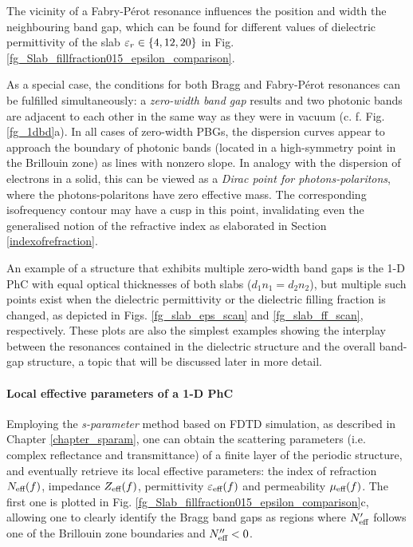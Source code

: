 The vicinity of a Fabry-Pérot resonance influences the position and width the neighbouring band gap, which can be found for different values of dielectric permittivity of the slab $\varepsilon_r\in\{4,12,20\}$ in Fig. \ref{fg_Slab_fillfraction015_epsilon_comparison}.

\label{diracpoint}
As a special case, the conditions for both Bragg and Fabry-Pérot resonances can be fulfilled simultaneously: a \textit{zero-width band gap} results and two photonic bands are adjacent to each other in the same way as they were in vacuum (c. f. Fig. \ref{fg_1dbd}a). In all cases of zero-width PBGs, the dispersion curves appear to approach the boundary of photonic bands (located in a high-symmetry point in the Brillouin zone) as lines with nonzero slope. In analogy with the dispersion of electrons in a solid, this can be viewed as a \textit{Dirac point for photons-polaritons}, where the photons-polaritons have zero effective mass. The corresponding isofrequency contour may have a cusp in this point, invalidating even the generalised notion of the refractive index as elaborated in Section \ref{indexofrefraction}.

An example of a structure that exhibits multiple zero-width band gaps is the 1-D PhC with equal optical thicknesses of both slabs ($d_1 n_1 = d_2 n_2$), but multiple such points exist when the dielectric permittivity or the dielectric filling fraction is changed, as depicted in Figs. \ref{fg_slab_eps_scan} and \ref{fg_slab_ff_scan}, respectively. These plots are also the simplest examples showing the interplay between the resonances contained in the dielectric structure and the overall band-gap structure, a topic that will be discussed later in more detail.

\paragraph{Local effective parameters of a 1-D PhC}%
Employing the \textit{s-parameter} method based on FDTD simulation, as described in Chapter \ref{chapter_sparam}, one can obtain the scattering parameters (i.e. complex reflectance and transmittance) of a finite layer of the periodic structure, and eventually retrieve its local effective parameters: the index of refraction $N_{\text{eff} }(f)$, impedance $Z_{\text{eff} }(f)$, permittivity $\varepsilon_{\text{eff} }(f)$ and permeability $\mu_{\text{eff} }(f)$. The first one is plotted in Fig. \ref{fg_Slab_fillfraction015_epsilon_comparison}c, allowing one to clearly identify the Bragg band gaps as regions where $N_{\text{eff} }'$ follows one of the Brillouin zone boundaries and $N_{\text{eff} }'' < 0$.

